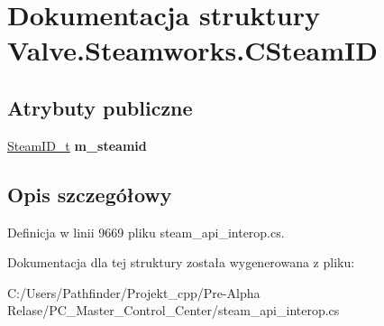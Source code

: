 \hypertarget{struct_valve_1_1_steamworks_1_1_c_steam_i_d}{}\section{Dokumentacja struktury Valve.\+Steamworks.\+C\+Steam\+ID}
\label{struct_valve_1_1_steamworks_1_1_c_steam_i_d}
\subsection*{Atrybuty publiczne}
\begin{DoxyCompactItemize}
\item 
\mbox{\label{struct_valve_1_1_steamworks_1_1_c_steam_i_d_a4782ad4d751e9c04063a292d968512ca}} 
\hyperlink{struct_valve_1_1_steamworks_1_1_steam_i_d__t}{Steam\+I\+D\+\_\+t} {\bfseries m\+\_\+steamid}
\end{DoxyCompactItemize}


\subsection{Opis szczegółowy}


Definicja w linii 9669 pliku steam\+\_\+api\+\_\+interop.\+cs.



Dokumentacja dla tej struktury została wygenerowana z pliku\+:\begin{DoxyCompactItemize}
\item 
C\+:/\+Users/\+Pathfinder/\+Projekt\+\_\+cpp/\+Pre-\/\+Alpha Relase/\+P\+C\+\_\+\+Master\+\_\+\+Control\+\_\+\+Center/steam\+\_\+api\+\_\+interop.\+cs\end{DoxyCompactItemize}
